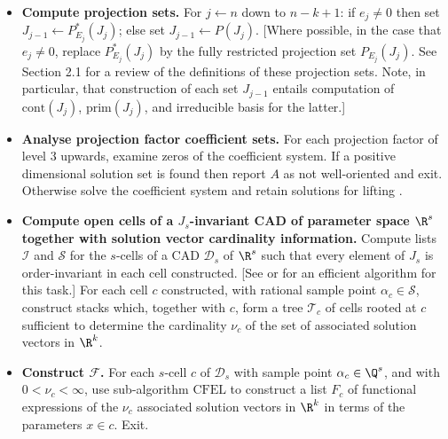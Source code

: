 \documentclass{article}
\begin{document}
\begin{algorithm}
\begin{itemize}
\medskip
     \item[3.] \textbf{Compute projection sets.}
     For $j \leftarrow n$ down to $n-k+1$: 
     if $e_j \neq 0$ then 
        set $J_{j-1} \leftarrow P_{E_j}^*(J_j)$;
     else
        set $J_{j-1} \leftarrow P(J_j)$.
     [Where possible, in the case that $e_j \neq 0$, 
     replace $P_{E_j}^*(J_j)$ by the fully
     restricted projection set $P_{E_j}(J_j)$. See Section 2.1
     for a review of the definitions of these projection sets.
     Note, in particular, that construction of each set $J_{j-1}$ entails
     computation of $\mathrm{cont}(J_j)$, $\mathrm{prim}(J_j)$, 
     and irreducible basis for the latter.]

\medskip
     \item[4.] \textbf{Analyse projection factor coefficient sets.}
     For each projection factor of level 3 upwards, examine zeros
     of the coefficient system. If a positive dimensional solution set is found then report $A$ as not well-oriented and exit. Otherwise solve the coefficient system and retain solutions for lifting \cite{Brown2001}.

\end{itemize}
\end{algorithm}

\setcounter{algocf}{0}

\begin{algorithm}[ht]
\caption{continued}
\begin{itemize}

     \item[5.] \textbf{Compute open cells of a $J_s$-invariant 
     CAD of parameter space $\R^s$
     together with solution vector cardinality information.}
     Compute lists $\mathcal{I}$ and $\mathcal{S}$ for the $s$-cells
     of a CAD ${\mathcal D}_s$ of $\R^s$ such that every element 
     of $J_s$ is order-invariant in each cell constructed.
     [See \cite{McCallum1993} or \cite{LR07} for an
     efficient algorithm for this task.] 
     For each cell $c$ constructed, with rational
     sample point $\alpha_c \in \mathcal{S}$, construct stacks which, 
     together with $c$, form a tree $\mathcal{T}_c$
     of cells rooted at $c$ sufficient to determine the cardinality
     $\nu_c$ of the set of associated solution vectors in $\R^k$.

\medskip

     \item[6.] \textbf{Construct ${\mathcal F}$.} For each $s$-cell $c$ of ${\mathcal D}_s$ with sample point $\alpha_c \in \Q^s$, and with
     $0 < \nu_c < \infty$, use sub-algorithm $\mathrm{CFEL}$ to construct
     a list $F_c$ of functional expressions of the $\nu_c$ associated solution vectors in $\R^k$ in terms of the parameters $x \in c$.
     Exit.
\end{itemize}
    
\end{algorithm}
\end{document}
